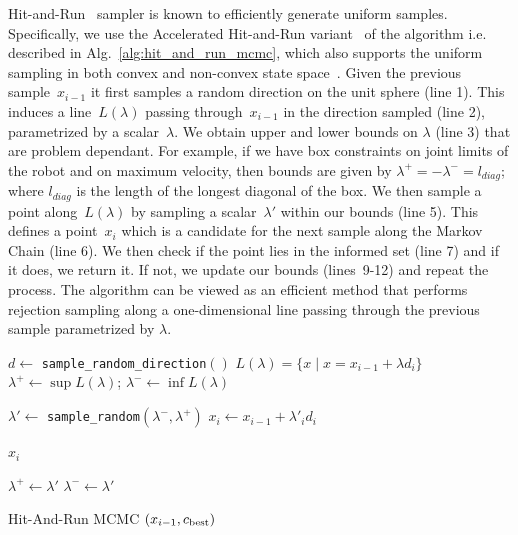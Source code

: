 \documentclass[letterpaper, 10 pt, conference]{ieeeconf}  %
\begin{document}
Hit-and-Run~\cite{S84} sampler is known to efficiently generate uniform samples. 
Specifically, we use the Accelerated Hit-and-Run variant~\cite{KSZ11} of the algorithm i.e. described in Alg.~\ref{alg:hit_and_run_mcmc}, which also supports the uniform sampling in both convex and non-convex state space~\cite{KSZ11}.
Given the previous sample~$x_{i-1}$ it first  samples a random direction on the unit sphere (line 1).
This induces a line~$L(\lambda)$ passing through~$x_{i-1}$ in the direction sampled (line 2), parametrized by a scalar~$\lambda$.
We obtain upper and lower bounds on $\lambda$ (line 3) that are problem dependant. 
For example, if we have box constraints on joint limits of the robot and on maximum velocity, then bounds are given by $\lambda^{+} = -\lambda^{-} = l_{diag}$; where $l_{diag}$ is the length of the longest diagonal of the box.
We then sample a point along~$L(\lambda)$ by sampling a scalar~$\lambda'$ within our bounds (line 5).
This defines a point~$x_{i}$ which is a candidate for the next sample along the Markov Chain (line 6).
We then check if the point lies in the informed set (line 7) and if it does, we return it.
If not, we update our bounds (lines~9-12) and repeat the process.
The algorithm can be viewed as an efficient method that performs rejection sampling along a one-dimensional line passing through the previous sample parametrized by $\lambda$.

\begin{algorithm}[t]
	\begin{algorithmic}[1]
		\STATE $d \leftarrow$ \texttt{sample\_random\_direction}$()$
		\STATE $ L(\lambda) = \{  x \mid x = x_{i-1} + \lambda d_i \} $
		\STATE $ \lambda^{+} \leftarrow \sup L(\lambda) $; 
		\hspace{3mm} 
		$ \lambda^{-} \leftarrow \inf L(\lambda) $
		
		\LOOP
		
		\STATE $ \lambda' \leftarrow$ \texttt{sample\_random}$ (\lambda^{-} , \lambda^{+})$
		\STATE $ x_{i} \leftarrow x_{i-1} + \lambda'_{i} d_i $
		
		\RETURN $ x_{i}$
		\ENDIF
		
		\STATE $ \lambda^{+} \leftarrow \lambda' $
		\ELSE
		\STATE $ \lambda^{-} \leftarrow \lambda'$
		\ENDIF
		
		\ENDLOOP
	\end{algorithmic}
	\caption{\captionstyle Hit-And-Run MCMC $(x_{i-1}, c_{\rm best})$}
	\label{alg:hit_and_run_mcmc}	
\end{algorithm}
\end{document}
